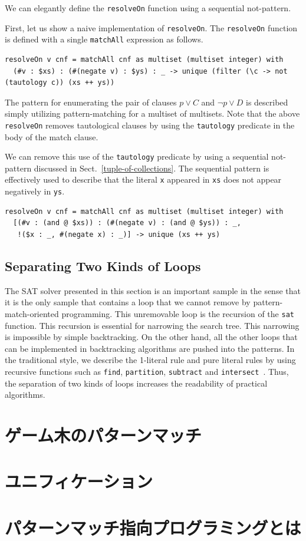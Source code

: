 We can elegantly define the \lstinline{resolveOn} function using a sequential not-pattern.

First, let us show a naive implementation of \lstinline{resolveOn}.
The \lstinline{resolveOn} function is defined with a single \lstinline{matchAll} expression as follows.

\begin{lstlisting}[language=egison]
resolveOn v cnf = matchAll cnf as multiset (multiset integer) with
  (#v : $xs) : (#(negate v) : $ys) : _ -> unique (filter (\c -> not (tautology c)) (xs ++ ys))
\end{lstlisting}

\noindent
The pattern for enumerating the pair of clauses $p \lor C$ and $\neg p \lor D$ is described simply utilizing pattern-matching for a multiset of multisets.
Note that the above \lstinline{resolveOn} removes tautological clauses by using the \lstinline{tautology} predicate in the body of the match clause.

We can remove this use of the \lstinline{tautology} predicate by using a sequential not-pattern discussed in Sect.~\ref{tuple-of-collections}.
The sequential pattern is effectively used to describe that the literal \lstinline{x} appeared in \lstinline{xs} does not appear negatively in \lstinline{ys}.

\begin{lstlisting}[language=egison]
resolveOn v cnf = matchAll cnf as multiset (multiset integer) with
  [(#v : (and @ $xs)) : (#(negate v) : (and @ $ys)) : _,
   !($x : _, #(negate x) : _)] -> unique (xs ++ ys)
\end{lstlisting}

\subsection{Separating Two Kinds of Loops}

The SAT solver presented in this section is an important sample in the sense that it is the only sample that contains a loop that we cannot remove by pattern-match-oriented programming.
This unremovable loop is the recursion of the \lstinline{sat} function.
This recursion is essential for narrowing the search tree.
This narrowing is impossible by simple backtracking.
On the other hand, all the other loops that can be implemented in backtracking algorithms are pushed into the patterns.
In the traditional style, we describe the 1-literal rule and pure literal rules by using recursive functions such as \lstinline{find}, \lstinline{partition}, \lstinline{subtract} and \lstinline{intersect}~\cite{harrison2009handbook}.
Thus, the separation of two kinds of loops increases the readability of practical algorithms.

\section{ゲーム木のパターンマッチ}\label{practice-tree}

\section{ユニフィケーション}\label{practice-unify}

\section{パターンマッチ指向プログラミングとは}\label{practice-pmo}

